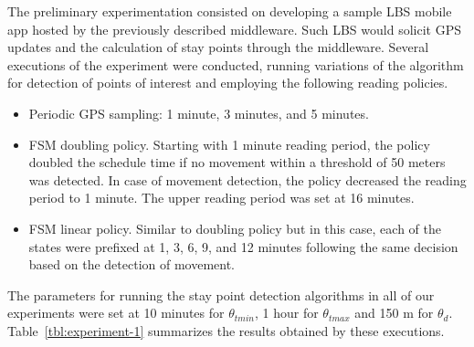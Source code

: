 \documentclass[ENG,PhD]{cinvestav}
\begin{document}
The preliminary experimentation consisted on developing a sample LBS mobile app hosted by the previously described middleware.
Such LBS would solicit GPS updates and the calculation of stay points through the middleware.
Several executions of the experiment were conducted, running variations of the algorithm for detection of points of interest and employing the following reading policies.
\begin{itemize}
  \item Periodic GPS sampling: 1 minute, 3 minutes, and 5 minutes.
  \item FSM doubling policy. Starting with 1 minute reading period, the policy doubled the schedule time if no movement within a threshold of 50 meters was detected. In case of movement detection, the policy decreased the reading period to 1 minute.
  The upper reading period was set at 16 minutes.
  \item FSM linear policy. Similar to doubling policy but in this case, each of the states were prefixed at 1, 3, 6, 9, and 12 minutes following the same decision based on the detection of movement.
\end{itemize}
 
The parameters for running the stay point detection algorithms in all of our experiments were set at 10 minutes for $\theta_{tmin}$, 1 hour for $\theta_{tmax}$ and 150 m for $\theta_{d}$.
Table~\ref{tbl:experiment-1} summarizes the results obtained by these executions.
\end{document}
